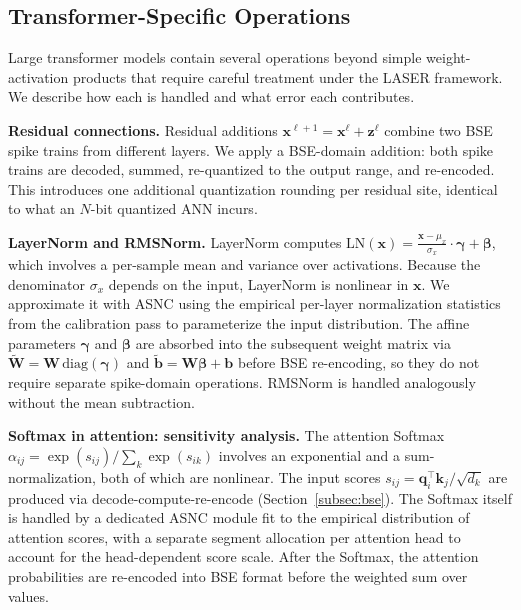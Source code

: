 \documentclass{article}
\theoremstyle{plain}
\theoremstyle{definition}
\theoremstyle{remark}
\begin{document}
\subsection{Transformer-Specific Operations}
\label{subsec:transformer_ops}

Large transformer models contain several operations beyond simple weight-activation
products that require careful treatment under the LASER framework. We describe how
each is handled and what error each contributes.

\noindent\textbf{Residual connections.}
Residual additions $\mathbf{x}^{\ell+1} = \mathbf{x}^\ell + \mathbf{z}^\ell$ combine
two BSE spike trains from different layers. We apply a BSE-domain addition: both spike
trains are decoded, summed, re-quantized to the output range, and re-encoded. This
introduces one additional quantization rounding per residual site, identical to what
an $N$-bit quantized ANN incurs.

\noindent\textbf{LayerNorm and RMSNorm.}
LayerNorm computes $\mathrm{LN}(\mathbf{x}) = \frac{\mathbf{x} - \mu_x}{\sigma_x} \cdot \boldsymbol{\gamma} + \boldsymbol{\beta}$, which involves a per-sample mean and variance over activations. Because the denominator $\sigma_x$ depends on the input, LayerNorm is nonlinear in $\mathbf{x}$. We approximate it with ASNC using the empirical per-layer normalization statistics from the calibration pass to parameterize the input distribution. The affine parameters $\boldsymbol{\gamma}$ and $\boldsymbol{\beta}$ are absorbed into the subsequent weight matrix via $\tilde{\mathbf{W}} = \mathbf{W}\,\mathrm{diag}(\boldsymbol{\gamma})$ and $\tilde{\mathbf{b}} = \mathbf{W}\boldsymbol{\beta} + \mathbf{b}$ before BSE re-encoding, so they do not require separate spike-domain operations. RMSNorm is handled analogously without the mean subtraction.

\noindent\textbf{Softmax in attention: sensitivity analysis.}
The attention Softmax $\alpha_{ij} = \exp(s_{ij}) / \sum_k \exp(s_{ik})$ involves an
exponential and a sum-normalization, both of which are nonlinear. The input scores
$s_{ij} = \mathbf{q}_i^\top \mathbf{k}_j / \sqrt{d_k}$ are produced via
decode-compute-re-encode (Section~\ref{subsec:bse}). The Softmax itself is handled
by a dedicated ASNC module fit to the empirical distribution of attention scores, with
a separate segment allocation per attention head to account for the head-dependent
score scale. After the Softmax, the attention probabilities are re-encoded into BSE
format before the weighted sum over values.
\end{document}
